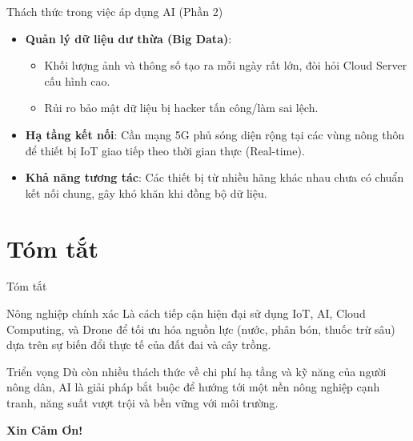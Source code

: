 \documentclass[aspectratio=169]{beamer}
\begin{document}
\begin{frame}{Thách thức trong việc áp dụng AI (Phần 2)}
    \begin{itemize}
        \item \textbf{Quản lý dữ liệu dư thừa (Big Data)}:
        \begin{itemize}
            \item Khối lượng ảnh và thông số tạo ra mỗi ngày rất lớn, đòi hỏi Cloud Server cấu hình cao.
            \item Rủi ro bảo mật dữ liệu bị hacker tấn công/làm sai lệch.
        \end{itemize}
        \item \textbf{Hạ tầng kết nối}: Cần mạng 5G phủ sóng diện rộng tại các vùng nông thôn để thiết bị IoT giao tiếp theo thời gian thực (Real-time).
        \item \textbf{Khả năng tương tác}: Các thiết bị từ nhiều hãng khác nhau chưa có chuẩn kết nối chung, gây khó khăn khi đồng bộ dữ liệu.
    \end{itemize}
\end{frame}

\section{Tóm tắt}
\begin{frame}{Tóm tắt}
    \begin{block}{Nông nghiệp chính xác}
        Là cách tiếp cận hiện đại sử dụng IoT, AI, Cloud Computing, và Drone để tối ưu hóa nguồn lực (nước, phân bón, thuốc trừ sâu) dựa trên sự biến đổi thực tế của đất đai và cây trồng.
    \end{block}
    \begin{block}{Triển vọng}
        Dù còn nhiều thách thức về chi phí hạ tầng và kỹ năng của người nông dân, AI là giải pháp bắt buộc để hướng tới một nền nông nghiệp cạnh tranh, năng suất vượt trội và bền vững với môi trường.
    \end{block}
\end{frame}

\begin{frame}
    \centering \Huge \textbf{Xin Cảm Ơn!}
\end{frame}
\end{document}
